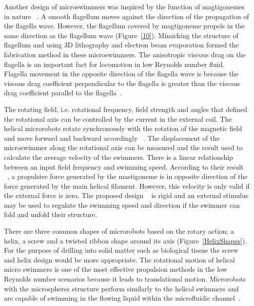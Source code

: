 \documentclass[12pt,a4paper,titlepage]{report}
\begin{document}
Another design of microswimmers was inspired by the function of magtigonemes in nature ~\citep{tottori2013artificial}.
 A smooth flagellum moves against the direction of the propagation of the flagella wave. However, 
the flagellum covered by magtigoneme propels in the same direction as the flagellum wave (Figure~\ref{10}). Mimicking 
the structure of flagellum and using 3D lithography and electron beam evaporation formed the fabrication 
method in these microswimmers.
The anisotropic viscous drag on the flagella is an important fact for locomotion in low Reynolds number fluid. 
Flagella movement in the opposite direction of the flagella wave is because the 
viscous drag coefficient perpendicular to the flagella is greater than the viscous drag coefficient parallel to 
the flagella~\citep{tottori2013artificial}. 

 The rotating field, i.e. rotational frequency, field strength and angles that 
defined the rotational axis can be controlled by the current in the external coil. The helical microrobots rotate 
synchronously with the rotation of the magnetic field and move forward and backward accordingly ~\citep{tottori2013artificial}. 
The displacement of the microswimmer along the rotational axis can be measured and the result 
used to calculate the average velocity of the swimmers. There is a linear relationship between an input 
field frequency and swimming speed. According to their result ~\citep{tottori2013artificial}, a propulsive force generated by 
the mastigoneme is in opposite direction of the force generated by the main helical filament. 
However, this velocity is only valid if the external force is zero. The proposed 
design ~\citep{tottori2013artificial} is rigid and an external stimulus may be used to regulate the swimming
 speed and direction if the swimmer can fold and unfold their structure. 


There are three common shapes of microrobots 
based on the rotary action; a helix, a screw and a twisted ribbon shape around its
 axis (Figure~\ref{HelixShapes}). For the purpose of drilling into solid matter such as biological tissue the screw and helix 
design would be more appropriate. The rotational motion of helical micro
 swimmers is one of the most effective propulsion methods in the low Reynolds number scenarios 
because it leads to translational motion. Microrobots with the microspheres structure perform similarly 
to the helical swimmers and are capable of swimming in the flowing liquid within the microfluidic channel~\citep{kim2013fabrication}. 
\end{document}
